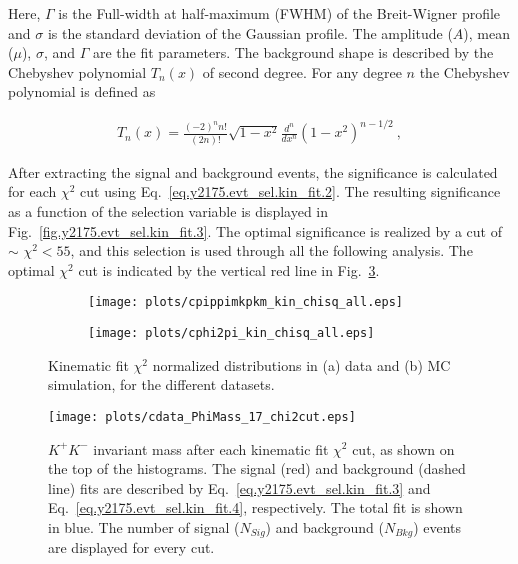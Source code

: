 \noindent Here, $\Gamma$ is the Full-width at half-maximum (FWHM) of the Breit-Wigner profile and $\sigma$ is the standard deviation of the Gaussian profile. The amplitude ($A$), mean ($\mu$),  $\sigma$, and $\Gamma$ are the fit parameters. The background shape is described by the Chebyshev polynomial $T_n(x)$ of second degree. For any degree $n$ the Chebyshev polynomial is defined as
 
\begin{equation}
    \label{eq.y2175.evt_sel.kin_fit.4}
    \begin{aligned}
        T_n(x) = \frac{(-2)^{n}n!}{(2n)!}\sqrt{1-x^2}\frac{d^n}{dx^n}(1-x^2)^{n-1/2}~,
    \end{aligned}
\end{equation}

After extracting the signal and background events, the significance is calculated for each $\chi^{2}$ cut using Eq.~\ref{eq.y2175.evt_sel.kin_fit.2}. The resulting significance as a function of the selection variable is displayed in Fig.~\ref{fig.y2175.evt_sel.kin_fit.3}. The optimal significance is realized by a cut of $\sim$ $\chi^2<55$, and this selection is used through all the following analysis. The optimal $\chi^{2}$ cut is indicated by the vertical red line in Fig.~\ref{fig.y2175.evt_sel.kin_fit.1}.

\begin{figure}[H]
    \centering
    \begin{subfigure}[b]{0.5\textwidth}
        \texttt{[image: plots/cpippimkpkm\_kin\_chisq\_all.eps]}
        \caption{}
        \label{fig.y2175.evt_sel.kin_fit.1.a}
    \end{subfigure}\hfill
    \begin{subfigure}[b]{0.5\textwidth}
        \texttt{[image: plots/cphi2pi\_kin\_chisq\_all.eps]}
        \caption{}
        \label{fig.y2175.evt_sel.kin_fit.1.b}
    \end{subfigure}
    \caption{Kinematic fit $\chi^2$ normalized distributions in (a) data and (b) MC simulation, for the different datasets.}
    \label{fig.y2175.evt_sel.kin_fit.1}
\end{figure}

\begin{figure}[H]
    \centering
        \texttt{[image: plots/cdata\_PhiMass\_17\_chi2cut.eps]}
        \caption{$K^+K^-$ invariant mass after each kinematic fit $\chi^2$ cut, as shown on the top of the histograms. The signal (red) and background (dashed line) fits are described by Eq.~\ref{eq.y2175.evt_sel.kin_fit.3} and Eq.~\ref{eq.y2175.evt_sel.kin_fit.4}, respectively. The total fit is shown in blue. The number of signal ($N_{Sig}$) and background ($N_{Bkg}$) events are displayed for every cut.}
        \label{fig.y2175.evt_sel.kin_fit.2}
\end{figure}

